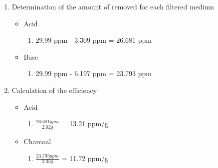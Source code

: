 \documentclass[10pt]{article}
\begin{document}
\begin{enumerate}[noitemsep]
\begin{enumerate}
    \end{enumerate}
    \item Determination of the amount of  removed for each filtered medium
    \begin{itemize}
        \item Acid
        \begin{enumerate}
            \item 29.99 ppm - 3.309 ppm = 26.681 ppm
        \end{enumerate}
        \item Base
        \begin{enumerate}
            \item 29.99 ppm - 6.197 ppm = 23.793 ppm
        \end{enumerate}
    \end{itemize}
    \item Calculation of the efficiency
    \begin{itemize}
        \item Acid
        \begin{enumerate}
            \item $\frac{26.681 ppm}{2.02 g}$ = 13.21 ppm/g
        \end{enumerate}
        \item Charcoal
        \begin{enumerate}
            \item $\frac{23.793 ppm}{2.03 g}$ = 11.72 ppm/g
        \end{enumerate}
    \end{itemize}
\end{enumerate}
\end{document}
